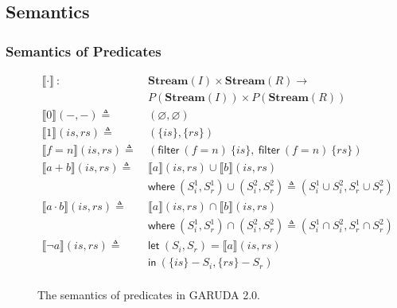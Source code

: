 \documentclass[12pt, letterpaper]{article}
\let\emptyset\varnothing
\newcommand\interp[1]{\llbracket #1 \rrbracket}
\def \sysname {\textsc{GARUDA 2.0}\xspace}
\begin{document}

    \clearpage
    \subsection{Semantics}\label{sec:spec:sem}
      \subsubsection{Semantics of Predicates}\label{sec:spec:sem:pred}
    
        \begin{figure}
          \centering
          \begin{align*}
            \interp{ \cdot }\ 
              :\ \ &
              \mathbf{Stream}(I)\times \mathbf{Stream}(R) \rightarrow \\
              & P(\mathbf{Stream}(I))\times P(\mathbf{Stream}(R)) 
              \\
            \interp{ 0 }(-, -)
              \triangleq\ &
              (\emptyset , \emptyset)
              \\ %
            \interp{ 1 }(\mathit{is}, \mathit{rs})
              \triangleq\ &
              (\{\mathit{is}\},\{\mathit{rs}\})
              \\
            \interp{ f=n }(\mathit{is}, \mathit{rs})
              \triangleq\ &
              (\mathsf{filter}\ (f=n)\ \{\mathit{is}\},\
               \mathsf{filter}\ (f=n)\ \{\mathit{rs}\}) 
              \\
            \interp{ a + b }(\mathit{is}, \mathit{rs})
              \triangleq\ &
              \interp { a }(\mathit{is}, \mathit{rs})\cup
              \interp { b }(\mathit{is}, \mathit{rs}) \\
              &\mathsf{where}\ (S_i^1, S_r^1)\cup (S_i^2, S_r^2)\triangleq
                (S_i^1\cup S_i^2, S_r^1\cup S_r^2)\\
            \interp { a \cdot b }(\mathit{is}, \mathit{rs})
              \triangleq\ &
              \interp { a }(\mathit{is}, \mathit{rs})\cap
              \interp { b }(\mathit{is}, \mathit{rs}) \\
              &\mathsf{where}\ (S_i^1, S_r^1)\cap (S_i^2, S_r^2)\triangleq
                (S_i^1\cap S_i^2, S_r^1\cap S_r^2)\\
            \interp { \neg a }(\mathit{is}, \mathit{rs})
              \triangleq\ &
              \mathsf{let}\ (S_i, S_r) = \interp {a}(\mathit{is}, \mathit{rs}) \\
              &\mathsf{in}\ (\{\mathit{is}\} - S_i, \{\mathit{rs}\} - S_r)
              \\
          \end{align*}
          \caption{The semantics of predicates in \sysname.}
          \label{fig:garuda:sem:pol}
        \end{figure}
\end{document}
